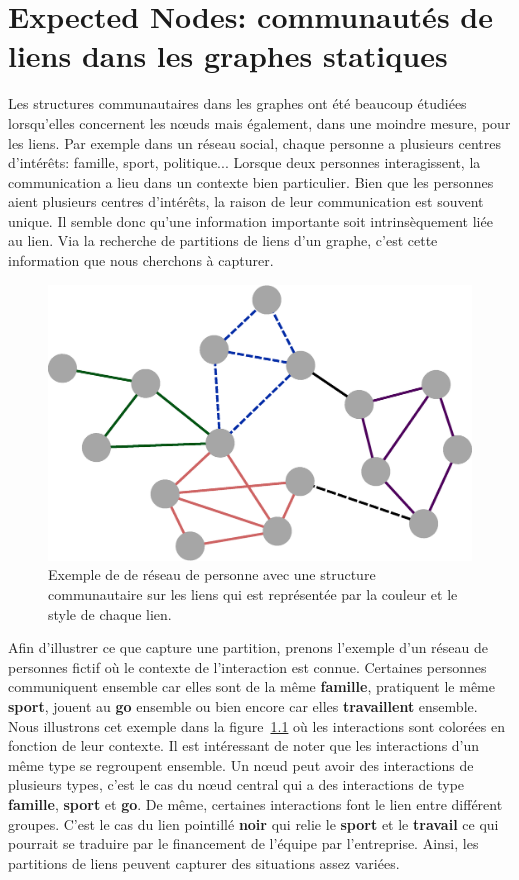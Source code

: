 \chapter{Expected Nodes: communautés de liens dans les graphes statiques}
\minitoc

Les structures communautaires dans les graphes ont été beaucoup étudiées lorsqu'elles concernent les n\oe uds mais également, dans une moindre mesure, pour les liens.
Par exemple dans un réseau social, chaque personne a plusieurs centres d'intérêts: famille, sport, politique...
Lorsque deux personnes interagissent, la communication a lieu dans un contexte bien particulier.
Bien que les personnes aient plusieurs centres d'intérêts, la raison de leur communication est souvent unique.
Il semble donc qu'une information importante soit intrinsèquement liée au lien.
Via la recherche de partitions de liens d'un graphe, c'est cette information que nous cherchons à capturer.

\begin{figure}
\centering
\includegraphics[width=0.5\linewidth]{img/ExpectedNodes/Link_Partition}
\caption{Exemple de de réseau de personne avec une structure communautaire sur les liens qui est représentée par la couleur et le style de chaque lien.}
\label{fig:linkpartition_exemple_expected}
\end{figure}
Afin d'illustrer ce que capture une partition, prenons l'exemple d'un réseau de personnes fictif où le contexte de l'interaction est connue.
Certaines personnes communiquent ensemble car elles sont de la même \textbf{\textcolor{bleu_random}{famille}}, pratiquent le même \textbf{\textcolor{rose_cochon}{sport}}, jouent au \textbf{\textcolor{vert_fonce}{go}} ensemble ou bien encore car elles \textbf{\textcolor{violet_cool}{travaillent}} ensemble.
Nous illustrons cet exemple dans la figure~\ref{fig:linkpartition_exemple_expected} où les interactions sont colorées en fonction de leur contexte.
Il est intéressant de noter que les interactions d'un même type se regroupent ensemble.
Un n\oe ud peut avoir des interactions de plusieurs types, c'est le cas du n\oe ud central qui a des interactions de type \textbf{\textcolor{bleu_random}{famille}}, \textbf{\textcolor{rose_cochon}{sport}} et \textbf{\textcolor{vert_fonce}{go}}.
De même, certaines interactions font le lien entre différent groupes.
C'est le cas du lien pointillé \textbf{noir} qui relie le \textbf{\textcolor{rose_cochon}{sport}} et le \textbf{\textcolor{violet_cool}{travail}} ce qui pourrait se traduire par le financement de l'équipe par l'entreprise.
Ainsi, les partitions de liens peuvent capturer des situations assez variées.

